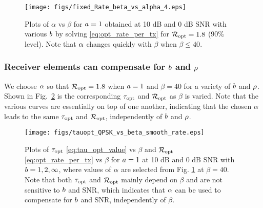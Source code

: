 \documentclass[12pt, draftclsnofoot,journal,onecolumn]{IEEEtran}
\begin{document}
\begin{figure}
\texttt{[image: figs/fixed\_Rate\_beta\_vs\_alpha\_4.eps]}
\centering
    \caption{Plots of $\alpha$ vs $\beta$ for $a=1$ obtained at 10 dB and 0 dB SNR with various $b$ by solving \eqref{eq:opt_rate_per_tx} for $\mathcal{R}_{\rm opt}=1.8$ (90\% level). Note that $\alpha$ changes quickly with $\beta$ when $\beta\leq 40$.}
    \label{fig:fixed_Rate_beta_vs_alpha}
\end{figure}

\subsubsection{Receiver elements can compensate for $b$ and $\rho$}
We choose $\alpha$ so that $\mathcal{R}_{\rm opt}=1.8$ when $a=1$ and $\beta=40$ for a variety of $b$ and $\rho$.
Shown in Fig.\ \ref{fig:fixed_Rate_beta_vs_tau} is the corresponding $\tau_{{\rm opt}}$ and $\mathcal{R}_{\rm opt}$ as $\beta$ is varied.  Note that the various curves are essentially on top of one another, indicating that the chosen $\alpha$ leads to the same $\tau_{{\rm opt}}$ and $\mathcal{R}_{\rm opt}$, independently of $b$ and $\rho$.




\begin{figure}
\texttt{[image: figs/tauopt\_QPSK\_vs\_beta\_smooth\_rate.eps]}
\centering
    \caption{Plots of $\tau_{{\rm opt}}$ \eqref{eq:tau_opt_value} vs $\beta$ and $\mathcal{R}_{\rm opt}$ \eqref{eq:opt_rate_per_tx} vs $\beta$ for $a=1$ at 10 dB and 0 dB SNR with $b=1,2,\infty$, where values of $\alpha$ are selected from Fig. \ref{fig:fixed_Rate_beta_vs_alpha} at $\beta=40$. Note that both $\tau_{{\rm opt}}$ and $\mathcal{R}_{\rm opt}$ mainly depend on $\beta$ and are not sensitive to $b$ and SNR, which indicates that $\alpha$ can be used to compensate for $b$ and SNR, independently of $\beta$.}
    \label{fig:fixed_Rate_beta_vs_tau}
\end{figure}
\end{document}
